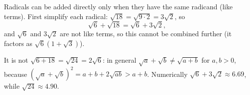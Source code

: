 Radicals can be added directly only when they have the same radicand (like terms). First simplify each radical: $\sqrt{18}=\sqrt{9\cdot2}=3\sqrt2$, so
\[
\sqrt6+\sqrt{18}=\boxed{\sqrt6+3\sqrt2},
\]
and $\sqrt6$ and $3\sqrt2$ are not like terms, so this cannot be combined further (it factors as $\sqrt6\left(1+\sqrt3\right)$).

It is not $\sqrt{6+18}=\sqrt{24}=2\sqrt6$: in general $\sqrt a+\sqrt b\ne\sqrt{a+b}$ for $a,b>0$, because $\left(\sqrt a+\sqrt b\right)^2=a+b+2\sqrt{ab}>a+b$. Numerically $\sqrt6+3\sqrt2\approx6.69$, while $\sqrt{24}\approx4.90$.
